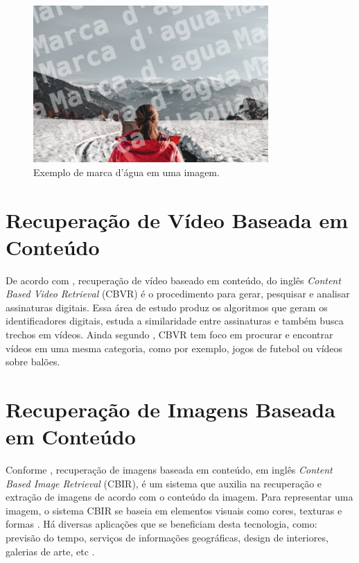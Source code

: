     	\begin{figure}[h]
        \centering
        \includegraphics[width=0.8\textwidth]{dados/figuras/marca_dagua.png}
        \caption{Exemplo de marca d'água em uma imagem.}
    	\label{fig:marcadagua}
    \end{figure}

\section{Recuperação de Vídeo Baseada em Conteúdo}
De acordo com \citeauthor{law2007video}, recuperação de vídeo baseado em conteúdo, do inglês \textit{Content Based Video Retrieval} (CBVR) é o procedimento para gerar, pesquisar e analisar assinaturas digitais. Essa área de estudo produz os algoritmos que geram os identificadores digitais, estuda a similaridade entre assinaturas e também busca trechos em vídeos. Ainda segundo \citeauthor{law2007video}, CBVR tem foco em procurar e encontrar vídeos em uma mesma categoria, como por exemplo, jogos de futebol ou vídeos sobre balões.

\section{Recuperação de Imagens Baseada em Conteúdo}
Conforme \citeauthor{gudivada1995content}, recuperação de imagens baseada em conteúdo, em inglês \textit{Content Based Image Retrieval} (CBIR), é um sistema que auxilia na recuperação e extração de imagens de acordo com o conteúdo da imagem. Para representar uma imagem, o sistema CBIR se baseia em elementos visuais como cores, texturas e formas \citeauthor{vikhar2016improved}. Há diversas aplicações que se beneficiam desta tecnologia, como: previsão do tempo, serviços de informações geográficas, design de interiores, galerias de arte, etc \citeauthor{gudivada1995content}.

